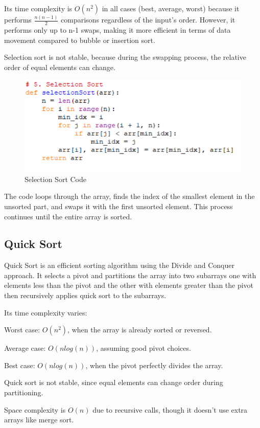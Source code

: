 \documentclass[sigconf]{acmart}
\begin{document}
Its time complexity is $O(n^2)$ in all cases (best, average, worst) because it performs $\frac{n(n-1)}{2}$ comparisons regardless of the input's order.
However, it performs only up to n-1 swaps, making it more efficient in terms of data movement compared to bubble or insertion sort.

Selection sort is not stable, because during the swapping process, the relative order of equal elements can change.

\begin{figure}[H]
\centering
\includegraphics[width=0.85\linewidth]{figures/005.pdf}
\vspace{-0.3cm}
\caption{Selection Sort Code}  
\vspace{-0.35cm}
\label{fig:proportion}
\end{figure}

The code loops through the array, finds the index of the smallest element in the unsorted part, and swaps it with the first unsorted element. This process continues until the entire array is sorted.
\subsection{Quick Sort}
Quick Sort is an efficient sorting algorithm using the Divide and Conquer approach. It selects a pivot and partitions the array into two subarrays one with elements less than the pivot and the other with elements greater than the pivot then recursively applies quick sort to the subarrays.

Its time complexity varies:

Worst case: $O(n^2)$, when the array is already sorted or reversed.

Average case: $O(nlog(n))$, assuming good pivot choices.

Best case: $O(nlog(n))$, when the pivot perfectly divides the array.

Quick sort is not stable, since equal elements can change order during partitioning.

Space complexity is $O(n)$ due to recursive calls, though it doesn't use extra arrays like merge sort.
\end{document}

